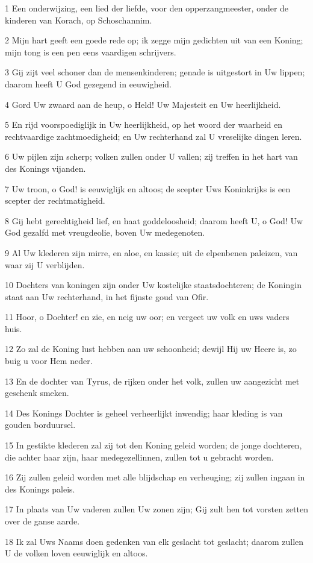 \par 1 Een onderwijzing, een lied der liefde, voor den opperzangmeester, onder de kinderen van Korach, op Schoschannim.
\par 2 Mijn hart geeft een goede rede op; ik zegge mijn gedichten uit van een Koning; mijn tong is een pen eens vaardigen schrijvers.
\par 3 Gij zijt veel schoner dan de mensenkinderen; genade is uitgestort in Uw lippen; daarom heeft U God gezegend in eeuwigheid.
\par 4 Gord Uw zwaard aan de heup, o Held! Uw Majesteit en Uw heerlijkheid.
\par 5 En rijd voorspoediglijk in Uw heerlijkheid, op het woord der waarheid en rechtvaardige zachtmoedigheid; en Uw rechterhand zal U vreselijke dingen leren.
\par 6 Uw pijlen zijn scherp; volken zullen onder U vallen; zij treffen in het hart van des Konings vijanden.
\par 7 Uw troon, o God! is eeuwiglijk en altoos; de scepter Uws Koninkrijks is een scepter der rechtmatigheid.
\par 8 Gij hebt gerechtigheid lief, en haat goddeloosheid; daarom heeft U, o God! Uw God gezalfd met vreugdeolie, boven Uw medegenoten.
\par 9 Al Uw klederen zijn mirre, en aloe, en kassie; uit de elpenbenen paleizen, van waar zij U verblijden.
\par 10 Dochters van koningen zijn onder Uw kostelijke staatsdochteren; de Koningin staat aan Uw rechterhand, in het fijnste goud van Ofir.
\par 11 Hoor, o Dochter! en zie, en neig uw oor; en vergeet uw volk en uws vaders huis.
\par 12 Zo zal de Koning lust hebben aan uw schoonheid; dewijl Hij uw Heere is, zo buig u voor Hem neder.
\par 13 En de dochter van Tyrus, de rijken onder het volk, zullen uw aangezicht met geschenk smeken.
\par 14 Des Konings Dochter is geheel verheerlijkt inwendig; haar kleding is van gouden borduursel.
\par 15 In gestikte klederen zal zij tot den Koning geleid worden; de jonge dochteren, die achter haar zijn, haar medegezellinnen, zullen tot u gebracht worden.
\par 16 Zij zullen geleid worden met alle blijdschap en verheuging; zij zullen ingaan in des Konings paleis.
\par 17 In plaats van Uw vaderen zullen Uw zonen zijn; Gij zult hen tot vorsten zetten over de ganse aarde.
\par 18 Ik zal Uws Naams doen gedenken van elk geslacht tot geslacht; daarom zullen U de volken loven eeuwiglijk en altoos.

